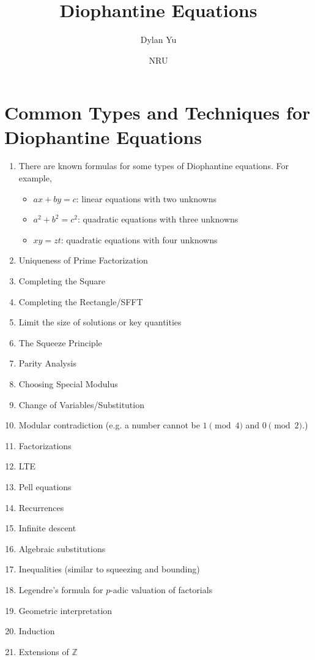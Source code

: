 \documentclass[mast]{lucky}
\title{Diophantine Equations}
\author{Dylan Yu}
\date{NRU}
\begin{document}
\maketitle

\section{Common Types and Techniques for Diophantine Equations}
\begin{enumerate}
    \item There are known formulas for some types of Diophantine equations. For example,
    \begin{itemize}
        \item $ax+by=c$: linear equations with two unknowns
        \item $a^2+b^2=c^2$: quadratic equations with three unknowns
        \item $xy=zt$: quadratic equations with four unknowns
    \end{itemize}
    \item Uniqueness of Prime Factorization
    \item Completing the Square
    \item Completing the Rectangle/SFFT
    \item Limit the size of solutions or key quantities
    \item The Squeeze Principle
    \item Parity Analysis
    \item Choosing Special Modulus
    \item Change of Variables/Substitution
    \item Modular contradiction (e.g. a number cannot be $1\pmod{4}$ and $0\pmod{2}$.)
    \item Factorizations
    \item LTE
    \item Pell equations
    \item Recurrences
    \item Infinite descent
    \item Algebraic substitutions
    \item Inequalities (similar to squeezing and bounding)
    \item Legendre's formula for $p$-adic valuation of factorials
    \item Geometric interpretation
    \item Induction
    \item Extensions of $\mathbb{Z}$
\end{enumerate}
\end{document}
